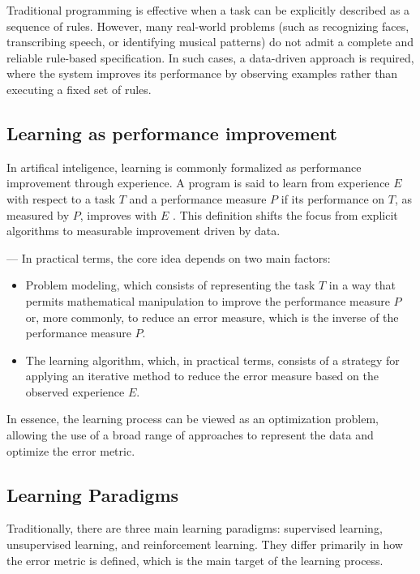 Traditional programming is effective when a task can be explicitly described as a sequence of rules. However, many real-world problems (such as recognizing faces, transcribing speech, or identifying musical patterns) do not admit a complete and reliable rule-based specification. In such cases, a data-driven approach is required, where the system improves its performance by observing examples rather than executing a fixed set of rules.

\subsection{Learning as performance improvement}

In artifical inteligence, learning is commonly formalized as performance improvement through experience. A program is said to learn from experience \( E \) with respect to a task \( T \) and a performance measure \( P \) if its performance on \( T \), as measured by \( P \), improves with \( E \) \cite{mitchell1997_machine_learning}. This definition shifts the focus from explicit algorithms to measurable improvement driven by data.

---
In practical terms, the core idea depends on two main factors:
\begin{itemize}
    \item Problem modeling, which consists of representing the task \( T \) in a way that permits mathematical manipulation to improve the performance measure \( P \) or, more commonly, to reduce an error measure, which is the inverse of the performance measure \( P \).
    \item The learning algorithm, which, in practical terms, consists of a strategy for applying an iterative method to reduce the error measure based on the observed experience \( E \).
\end{itemize}

In essence, the learning process can be viewed as an optimization problem, allowing the use of a broad range of approaches to represent the data and optimize the error metric.

\subsection{Learning Paradigms}

Traditionally, there are three main learning paradigms: supervised learning, unsupervised learning, and reinforcement learning. They differ primarily in how the error metric is defined, which is the main target of the learning process.

